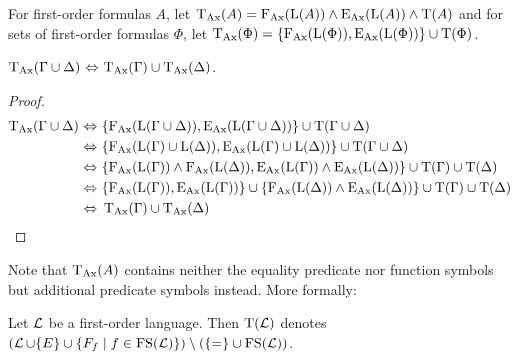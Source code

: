 \begin{defi}
	For first-order formulas $A$, let $\TransAll(A) = \FAX(\Lang(A)) \land \EAX(\Lang(A)) \land \Trans(A)$ and for sets of first-order formulas $\Phi$, let $\TransAll(\Phi) = \{\FAX(\Lang(\Phi)), \EAX(\Lang(\Phi))\} \cup \Trans(\Phi)$.
\end{defi}

\begin{lemma}
	\label{lemma:trans_transform}
	$\TransAll(\Gamma \cup \Delta)\,\liff\,\TransAll(\Gamma) \cup \TransAll(\Delta)$.
\end{lemma}
\begin{proof}
	\begin{align*}
		\TransAll(\Gamma \cup \Delta)\,\liff~&\{\FAX(\Lang(\Gamma\cup\Delta)), \EAX(\Lang(\Gamma \cup\Delta))\} \cup \Trans(\Gamma \cup \Delta) \\
		\liff~&\{\FAX(\Lang(\Gamma)\cup\Lang(\Delta)), \EAX(\Lang(\Gamma)\cup\Lang(\Delta))\} \cup \Trans(\Gamma \cup \Delta) \\
		\liff~&\{\FAX(\Lang(\Gamma)) \land \FAX(\Lang(\Delta)), \EAX(\Lang(\Gamma)) \land \EAX(\Lang(\Delta))\} \cup \Trans(\Gamma) \cup \Trans(\Delta) \\
		\liff~&\{\FAX(\Lang(\Gamma)),\EAX(\Lang(\Gamma))\} \cup \{\FAX(\Lang(\Delta)) \land \EAX(\Lang(\Delta))\} \cup \Trans(\Gamma) \cup \Trans(\Delta) \\
		\liff~&\TransAll(\Gamma) \cup \TransAll(\Delta)
		\qedhere
	\end{align*}
\end{proof}

Note that $\TransAll(A)$ contains neither the equality predicate nor function symbols but additional predicate symbols instead. More formally:

\begin{defi}[continues=exa:cont]
	Let $\LangSym$ be a first-order language. 
	Then $\Trans(\LangSym)$ denotes $(\LangSym\cup \{E\}\cup\{F_f\mid f \in \FS(\LangSym)\}) \setminus(\{=\nolinebreak \} \cup\nolinebreak \FS(\LangSym))$.
\end{defi}

